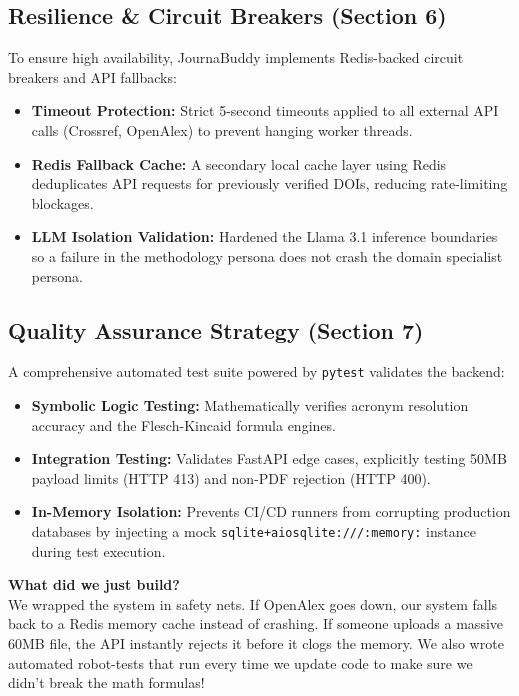 \documentclass[11pt,a4paper]{article}
\begin{document}
\subsection*{Resilience \& Circuit Breakers (Section 6)}
To ensure high availability, JournaBuddy implements Redis-backed circuit breakers and API fallbacks:
\begin{itemize}
    \item \textbf{Timeout Protection:} Strict 5-second timeouts applied to all external API calls (Crossref, OpenAlex) to prevent hanging worker threads.
    \item \textbf{Redis Fallback Cache:} A secondary local cache layer using Redis deduplicates API requests for previously verified DOIs, reducing rate-limiting blockages.
    \item \textbf{LLM Isolation Validation:} Hardened the Llama 3.1 inference boundaries so a failure in the methodology persona does not crash the domain specialist persona.
\end{itemize}

\subsection*{Quality Assurance Strategy (Section 7)}
A comprehensive automated test suite powered by \texttt{pytest} validates the backend:
\begin{itemize}
    \item \textbf{Symbolic Logic Testing:} Mathematically verifies acronym resolution accuracy and the Flesch-Kincaid formula engines.
    \item \textbf{Integration Testing:} Validates FastAPI edge cases, explicitly testing 50MB payload limits (HTTP 413) and non-PDF rejection (HTTP 400).
    \item \textbf{In-Memory Isolation:} Prevents CI/CD runners from corrupting production databases by injecting a mock \texttt{sqlite+aiosqlite:///:memory:} instance during test execution.
\end{itemize}

\vspace{0.5cm}
\begin{tcolorbox}[colback=blue!5,colframe=blue!40!black,title=For Dummies: Resilience \& Testing]
\textbf{What did we just build?} \\
We wrapped the system in safety nets. If OpenAlex goes down, our system falls back to a Redis memory cache instead of crashing. If someone uploads a massive 60MB file, the API instantly rejects it before it clogs the memory. We also wrote automated robot-tests that run every time we update code to make sure we didn't break the math formulas!
\end{tcolorbox}
\end{document}
